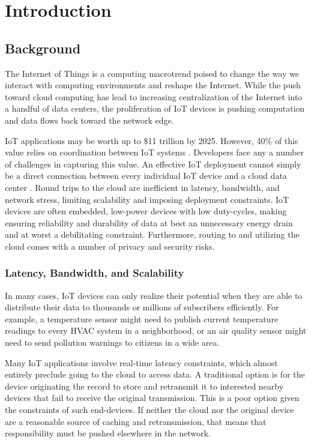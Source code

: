 \chapter{Introduction}

\section{Background}

The Internet of Things is a computing macrotrend poised to change the way we interact with computing environments and reshape the Internet. While the push toward cloud computing has lead to increasing centralization of the Internet into a handful of data centers, the proliferation of IoT devices is pushing computation and data flows back toward the network edge.

IoT applications may be worth up to \$11 trillion by 2025. However, 40\% of this value relies on coordination between IoT systems \cite{McKinsey}. Developers face any a number of challenges in capturing this value. An effective IoT deployment cannot simply be a direct connection between every individual IoT device and a cloud data center \cite{kubi}. Round trips to the cloud are inefficient in  latency, bandwidth, and network stress, limiting scalability and imposing deployment constraints. IoT devices are often embedded, low-power devices with low duty-cycles, making ensuring reliability and durability of data at best an unnecessary energy drain and at worst a debilitating constraint. Furthermore, routing to and utilizing the cloud comes with a number of privacy and security risks.

\subsection{Latency, Bandwidth, and Scalability}
In many cases, IoT devices can only realize their potential when they are able to distribute their data to thousands or millions of subscribers efficiently. For example, a temperature sensor might need to publish current temperature readings to every HVAC system in a neighborhood, or an air quality sensor might need to send pollution warnings to citizens in a wide area. 

Many IoT applications involve real-time latency constraints, which almost entirely preclude going to the cloud to access data.  A traditional option is for the device originating the record to store and retransmit it to interested nearby devices that fail to receive the original transmission.  This is a poor option given the constraints of such end-devices.  If neither the cloud nor the original device are a reasonable source of caching and retransmission, that means that responsibility must be pushed elsewhere in the network.

